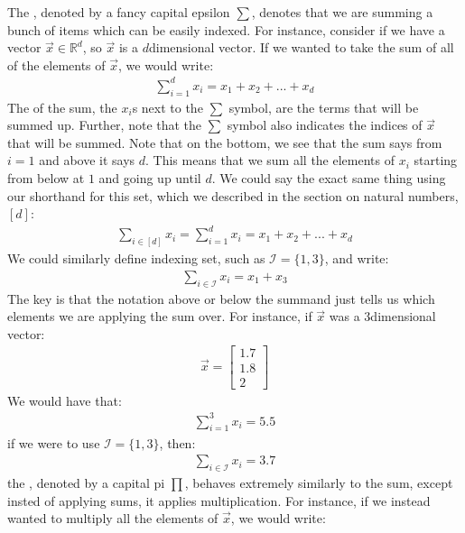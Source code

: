 \documentclass[letterpaper,10pt,english]{jupyterBook}
\begin{document}
\sphinxAtStartPar
The , denoted by a fancy capital epsilon \(\sum\), denotes that we are summing a bunch of items which can be easily indexed. For instance, consider if we have a vector \(\vec x \in \mathbb R^d\), so \(\vec x\) is a \(d\)\sphinxhyphen{}dimensional vector. If we wanted to take the sum of all of the elements of \(\vec x\), we would write:
\begin{align*}
    \sum_{i = 1}^d x_i = x_1 + x_2 + ... + x_d
\end{align*}
\sphinxAtStartPar
The  of the sum, the \(x_i\)s next to the \(\sum\) symbol, are the terms that will be summed up. Further, note that the \(\sum\) symbol also indicates the indices of \(\vec x\) that will be summed. Note that on the bottom, we see that the sum says from \(i = 1\) and above it says \(d\). This means that we sum all the elements of \(x_i\) starting from below at \(1\) and going up until \(d\). We could say the exact same thing using our shorthand for this set, which we described in the section on natural numbers, \([d]\):
\begin{align*}
\sum_{i \in [d]} x_i = \sum_{i = 1}^d x_i = x_1 + x_2 + ... + x_d
\end{align*}
\sphinxAtStartPar
We could similarly define  indexing set, such as \(\mathcal I = \{1,3\}\), and write:
\begin{align*}
    \sum_{i \in \mathcal I} x_i = x_1 + x_3
\end{align*}
\sphinxAtStartPar
The key is that the notation above or below the summand just tells us which elements we are applying the sum over. For instance, if \(\vec x\) was a \(3\)\sphinxhyphen{}dimensional vector:
\begin{align*}
   \vec x = \begin{bmatrix}
      1.7 \\ 1.8 \\ 2
   \end{bmatrix}
\end{align*}
\sphinxAtStartPar
We would have that:
\begin{align*}
   \sum_{i = 1}^3 x_i = 5.5
\end{align*}
\sphinxAtStartPar
if we were to use \(\mathcal I = \{1,3\}\), then:
\begin{align*}
    \sum_{i \in \mathcal I}x_i = 3.7
\end{align*}
\sphinxAtStartPar
the , denoted by a capital pi \(\prod\), behaves extremely similarly to the sum, except insted of applying sums, it applies multiplication. For instance, if we instead wanted to multiply all the elements of \(\vec x\), we would write:
\end{document}
